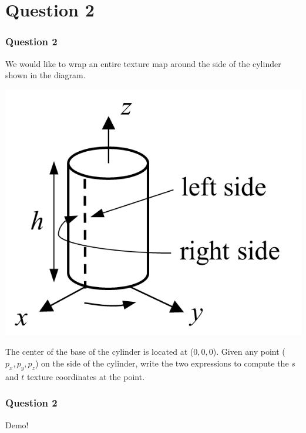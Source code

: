 \documentclass{beamer}
\begin{document}
\section{Question 2}

\begin{frame}
    \frametitle{Question 2}
    We would like to wrap an entire texture map around the side of the cylinder shown in the diagram. 

    \begin{center}
        \includegraphics[scale=0.7]{q2.png}
    \end{center}
    
    The center of the base of the cylinder is located at ($0, 0, 0$). 
    Given any point ($p_x, p_y, p_z$) on the side of the cylinder, 
    write the two expressions to compute the $s$ and $t$ texture coordinates at the point. 
    

\end{frame}

\begin{frame}
    \frametitle{Question 2}

    Demo!


\end{frame}
\end{document}
